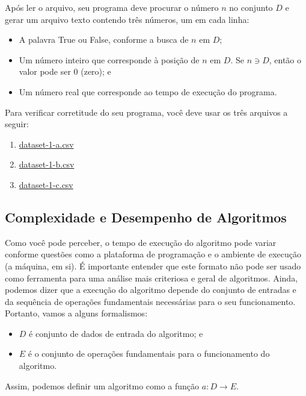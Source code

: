 \documentclass{article}
\begin{document}
Após ler o arquivo, seu programa deve procurar o número \(n\) no
conjunto \(D\) e gerar um arquivo texto contendo três números, um em
cada linha:

\begin{itemize}
\itemsep1pt\parskip0pt
\item
  A palavra True ou False, conforme a busca de \(n\) em \(D\);
\item
  Um número inteiro que corresponde à posição de \(n\) em \(D\). Se
  \(n \ni D\), então o valor pode ser \(0\) (zero); e
\item
  Um número real que corresponde ao tempo de execução do programa.
\end{itemize}

Para verificar corretitude do seu programa, você deve usar os três
arquivos a seguir:

\begin{enumerate}
\def\labelenumi{\arabic{enumi}.}
\itemsep1pt\parskip0pt
\item
  \url{dataset-1-a.csv}
\item
  \url{dataset-1-b.csv}
\item
  \url{dataset-1-c.csv}
\end{enumerate}


    \subsection{Complexidade e Desempenho de Algoritmos}


    Como você pode perceber, o tempo de execução do algoritmo pode variar
conforme questões como a plataforma de programação e o ambiente de
execução (a máquina, em si). É importante entender que este formato não
pode ser usado como ferramenta para uma análise mais criteriosa e geral
de algoritmos. Ainda, podemos dizer que a execução do algoritmo depende
do conjunto de entradas e da sequência de operações fundamentais
necessárias para o seu funcionamento. Portanto, vamos a alguns
formalismos:

\begin{itemize}
\itemsep1pt\parskip0pt
\item
  \(D\) é conjunto de dados de entrada do algoritmo; e
\item
  \(E\) é o conjunto de operações fundamentais para o funcionamento do
  algoritmo.
\end{itemize}

Assim, podemos definir um algoritmo como a função
\(a : D \rightarrow E\).
\end{document}
